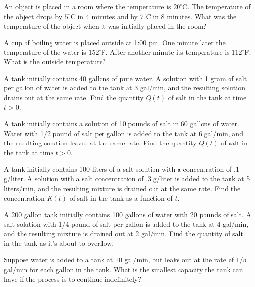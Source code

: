\begin{exerciselist}
  \item\label{exer:4.2.6} An object is placed in a room where the temperature is $20^{\circ}$C. The
        temperature of the object drops by $5^{\circ}$C in 4 minutes and by $7^{\circ}$C in 8
        minutes. What was the temperature of the object when it was initially placed in the room?

  \item\label{exer:4.2.7} A cup of boiling water is placed outside at 1:00 {\sc pm}. One minute
        later the temperature of the water is $152^{\circ}$F. After another minute its temperature
        is $112^{\circ}$F. What is the outside temperature?

  \item\label{exer:4.2.8} A tank initially contains 40 gallons of pure water. A solution with 1 gram
        of salt per gallon of water is added to the tank at 3 gal/min, and the resulting solution
        drains out at the same rate. Find the quantity $Q(t)$ of salt in the tank at time $t>0$.

  \item\label{exer:4.2.9} A tank initially contains a solution of 10 pounds of salt in 60 gallons of
        water. Water with 1/2 pound of salt per gallon is added to the tank at 6 gal/min, and the
        resulting solution leaves at the same rate. Find the quantity $Q(t)$ of salt in the tank at
        time $t>0$.

  \item\label{exer:4.2.10} A tank initially contains 100 liters of a salt solution with a
        concentration of .1 g/liter. A solution with a salt concentration of .3 g/liter is added to
        the tank at 5 liters/min, and the resulting mixture is drained out at the same rate. Find
        the concentration $K(t)$ of salt in the tank as a function of $t$.

  \item\label{exer:4.2.11} A 200 gallon tank initially contains 100 gallons of water with 20 pounds
        of salt. A salt solution with 1/4 pound of salt per gallon is added to the tank at 4
        gal/min, and the resulting mixture is drained out at 2 gal/min. Find the quantity of salt in
        the tank as it's about to overflow.

  \item\label{exer:4.2.12} Suppose water is added to a tank at 10 gal/min, but leaks out at the rate
        of 1/5 gal/min for each gallon in the tank. What is the smallest capacity the tank can have
        if the process is to continue indefinitely?


\end{exerciselist}
